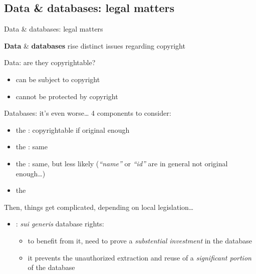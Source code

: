 \documentclass[10pt,xcolor=svgnames]{beamer}
\begin{document}
\subsection{Data \& databases: legal matters}
\begin{frame}{Data \& databases: legal matters}

  \begin{alertblock}{}
    \begin{center}\textbf{Data} \& \textbf{databases} rise distinct issues regarding copyright\end{center}
  \end{alertblock}

  \vspace{-2em}
  \begin{overprint}
    \begin{block}{Data: are they copyrightable?}
      \begin{itemize}
        \item {} can be subject to copyright
        \item {} cannot be protected by copyright \\ 
      \end{itemize}
    \end{block}
  
    \begin{block}{Databases: it's even worse\ldots}
      4 components to consider:
      \begin{itemize}
        \item the : copyrightable if original enough
        \item the : same
        \item the : same, but less likely (\emph{``name''} or \emph{``id''} are in general not original enough\ldots)
        \item the 
      \end{itemize}
    
      Then, things get complicated, depending on local legislation\ldots
      \begin{itemize}
        \item {}: \emph{sui generis} database rights:
          \begin{itemize}
            \item to benefit from it, need to prove a \emph{substential investment} in the database
            \item it prevents the unauthorized extraction and reuse of a \emph{significant portion}\empha{*} of the database
          \end{itemize}
      \end{itemize}


\end{block}
\end{overprint}
\end{frame}
\end{document}
